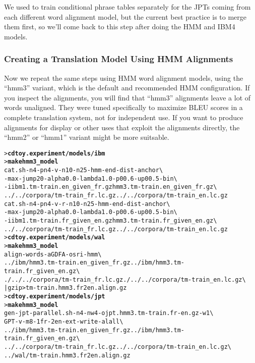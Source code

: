 \documentclass[11pt,letterpaper]{article}
\newcommand{\bs}{\textbackslash{}}
\begin{document}
We used to train conditional phrase tables separately for the JPTs coming from
each different word alignment model, but the current best practice is to
merge them first, so we'll come back to this step after doing the HMM and IBM4
models.

\subsubsection{Creating a Translation Model Using HMM Alignments} \label{HMM}

Now we repeat the same steps using HMM word alignment models, using the
``hmm3'' variant, which is the default and recommended HMM configuration.
If you
inspect the alignments, you will find that ``hmm3'' alignments leave a lot of
words unaligned.  They were tuned
specifically to maximize BLEU scores in a complete translation system, not for
independent use.  If you want to produce alignments for display or other uses
that exploit the alignments directly, the ``hmm2'' or ``hmm1''
variant might be more suitsable.

\begin{small}
\begin{alltt}
   > \textbf{cd toy.experiment/models/ibm}
   > \textbf{make hmm3_model}
   cat.sh -n 4 -pn 4 -v -n1 0 -n2 5 -hmm -end-dist -anchor \bs
      -max-jump 20 -alpha 0.0 -lambda 1.0 -p0 0.6 -up0 0.5 -bin \bs
      -i ibm1.tm-train.en_given_fr.gz hmm3.tm-train.en_given_fr.gz \bs
      ../../corpora/tm-train_fr.lc.gz ../../corpora/tm-train_en.lc.gz
   cat.sh -n 4 -pn 4 -v -r -n1 0 -n2 5 -hmm -end-dist -anchor \bs
      -max-jump 20 -alpha 0.0 -lambda 1.0 -p0 0.6 -up0 0.5 -bin \bs
      -i ibm1.tm-train.fr_given_en.gz hmm3.tm-train.fr_given_en.gz \bs
      ../../corpora/tm-train_fr.lc.gz ../../corpora/tm-train_en.lc.gz
   > \textbf{cd toy.experiment/models/wal}
   > \textbf{make hmm3_model}
   align-words -a GDFA -o sri -hmm \bs
      ../ibm/hmm3.tm-train.en_given_fr.gz ../ibm/hmm3.tm-train.fr_given_en.gz \bs
      ./../../corpora/tm-train_fr.lc.gz ./../../corpora/tm-train_en.lc.gz \bs
      | gzip > tm-train.hmm3.fr2en.align.gz
   > \textbf{cd toy.experiment/models/jpt}
   > \textbf{make hmm3_model}
   gen-jpt-parallel.sh -n 4 -nw 4 -o jpt.hmm3.tm-train.fr-en.gz -w 1 \bs
      GPT -v -m 8 -1 fr -2 en -ext -write-al all \bs
      ../ibm/hmm3.tm-train.en_given_fr.gz ../ibm/hmm3.tm-train.fr_given_en.gz \bs
      ../../corpora/tm-train_fr.lc.gz ../../corpora/tm-train_en.lc.gz \bs
      ../wal/tm-train.hmm3.fr2en.align.gz
\end{alltt}
\end{small}
\end{document}
